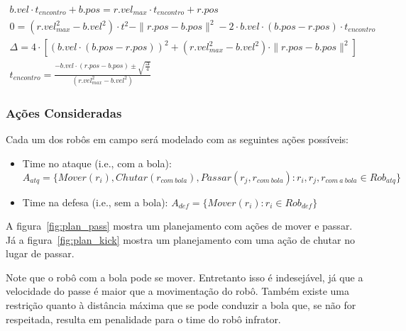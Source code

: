 \begin{gather}  
  b.vel \cdot t_{encontro} + b.pos = r.vel_{max} \cdot t_{encontro} + r.pos\\
  0 = (r.vel^2_{max}-b.vel^2) \cdot t^2 - \parallel r.pos - b.pos \parallel ^2
     - 2 \cdot b.vel \cdot (b.pos - r.pos) \cdot t_{encontro}\\
  \Delta = 4 \cdot [ ( b.vel \cdot (b.pos - r.pos)) ^2 +
           (r.vel_{max}^2 - b.vel^2) \cdot \parallel r.pos - b.pos \parallel ^2]\\
  \boxed{t_{encontro} = \frac{ - b.vel \cdot (r.pos - b.pos) \pm \sqrt {\frac{\Delta}{4}}}
                 {(r.vel^2_{max} - b.vel^2)}}
\end{gather} 

\subsubsection{Ações Consideradas}
Cada um dos robôs em campo será modelado com as seguintes ações possíveis:
\begin{itemize}
  \item Time no ataque (i.e., com a bola):\\
        $A_{atq} = \lbrace Mover(r_i), Chutar(r_{com{\ }bola}), Passar(r_j,r_{com{\ }bola}):
                    r_i, r_j, r_{com{\ }a{\ }bola} \in Rob_{atq}\rbrace$

  \item Time na defesa (i.e., sem a bola):
        $A_{def} = \lbrace Mover(r_i): r_i \in Rob_{def}\rbrace$
\end{itemize}

A figura~\ref{fig:plan_pass} mostra um planejamento com ações de mover e
passar. Já a figura~\ref{fig:plan_kick} mostra um planejamento com uma
ação de chutar no lugar de passar.


Note que o robô com a bola pode se mover. Entretanto isso é indesejável, já que
a velocidade do passe é maior que a movimentação do robô. Também existe uma
restrição quanto à distância máxima que se pode conduzir a bola que, se não
for respeitada, resulta em penalidade para o time do robô infrator.

